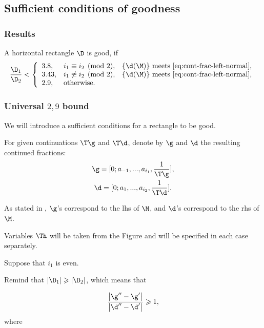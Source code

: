 \subsection{Sufficient conditions of goodness}

\subsubsection{Results}

A horizontal rectangle $\D$ is good, if
\begin{equation}\label{goodness_condition}
	\dfrac{\D_1}{\D_2} <
	\left\{\begin{array}{lll}
		3.8, & i_1 \equiv i_2 \pmod 2, & \{\d(\M)\} \text{ meets \ref{eq:cont-frac-left-normal},} \\
		3.43, & i_1 \not\equiv i_2 \pmod 2, & \{\d(\M)\} \text{ meets \ref{eq:cont-frac-left-normal},} \\
		2.9, & \text{otherwise}.
	\end{array}\right.
\end{equation}

\subsubsection{Universal $2,9$ bound}

We will introduce a sufficient conditions for a rectangle to be good.

\begin{designation}
	For given continuations $\T\g$ and $\T\d$, denote by $\g$ and $\d$ the resulting continued fractions:
	\begin{gather*}
		\g = [0; a_{-1}, ..., a_{i_1}, \frac{1}{\T\g}], \\
		\d = [0; a_{1}, ..., a_{i_2}, \frac{1}{\T\d}].
	\end{gather*}

	As stated in ,
	$\g$'s correspond to the lhs of $\M$, and $\d$'s correspond to the rhs of $\M$.
	
	Variables $\Th$ will be taken from the Figure 
	and will be specified in each case separately.
\end{designation}

Suppose that $i_1$ is even.

Remind that $|\D_1| \geqslant |\D_2|$, which means that

\begin{equation*}
	\dfrac{\left| \g'' - \g' \right|}{\left| \d'' - \d' \right|} \geqslant 1,
\end{equation*}
%
where
%

